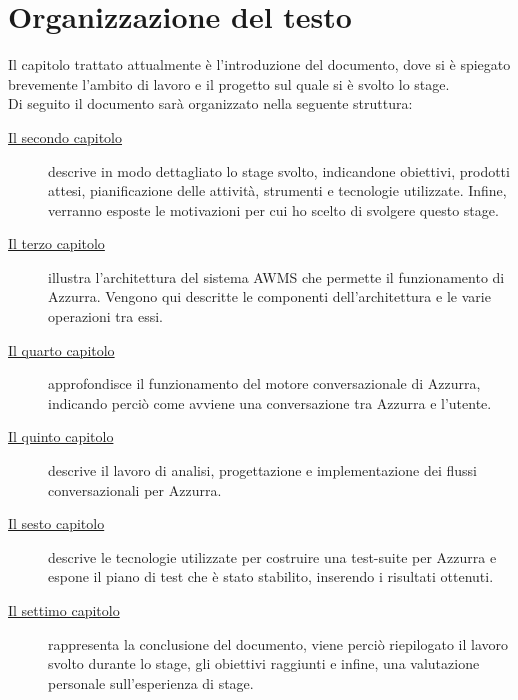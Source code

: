 \section{Organizzazione del testo}
Il capitolo trattato attualmente è l'introduzione del documento, dove si è spiegato brevemente l'ambito di lavoro e il progetto sul quale si è svolto lo stage.\\
Di seguito il documento sarà organizzato nella seguente struttura:
\begin{description}
    
    \item[{\hyperref[cap:descrizione-stage]{Il secondo capitolo}}] descrive in modo dettagliato lo stage svolto, indicandone obiettivi, prodotti attesi, pianificazione delle attività, strumenti e tecnologie utilizzate. Infine, verranno esposte le motivazioni per cui ho scelto di svolgere questo stage.
    
    \item[{\hyperref[cap:archittettura del sistema AWMS]{Il terzo capitolo}}] illustra l'\gls{architettura}\ap{[g]} del sistema \gls{AWMS} che permette il funzionamento di Azzurra. Vengono qui descritte le componenti dell'architettura e le varie operazioni tra essi.
    
    \item[{\hyperref[cap:flow engine]{Il quarto capitolo}}] approfondisce il funzionamento del motore conversazionale di Azzurra, indicando perciò come avviene una conversazione tra Azzurra e l'utente.
    
    \item[{\hyperref[cap:flussi di conversazione]{Il quinto capitolo}}] descrive il lavoro di analisi, progettazione e implementazione dei flussi conversazionali per Azzurra.
    
    \item[{\hyperref[cap:test]{Il sesto capitolo}}] descrive le tecnologie utilizzate per costruire una test-suite per Azzurra e espone il piano di test che è stato stabilito, inserendo i risultati ottenuti.
    
    \item[{\hyperref[cap:conclusioni]{Il settimo capitolo}}] rappresenta la conclusione del documento, viene perciò riepilogato il lavoro svolto durante lo stage, gli obiettivi raggiunti e infine, una valutazione personale sull'esperienza di stage.
\end{description}
